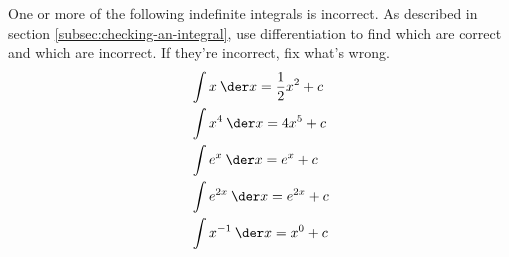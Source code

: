 One or more of the following indefinite integrals is incorrect.
As described in section \ref{subsec:checking-an-integral}, use differentiation
to find which are correct and which are incorrect. If they're incorrect, fix what's wrong.
\begin{align*}
  & \int x\:\der x = \frac{1}{2}x^2+c \\
  & \int x^4\:\der x = 4x^5+c \\
  & \int e^x\:\der x = e^x+c \\
  & \int e^{2x}\:\der x = e^{2x}+c \\
  & \int x^{-1}\:\der x = x^0+c 
\end{align*}
